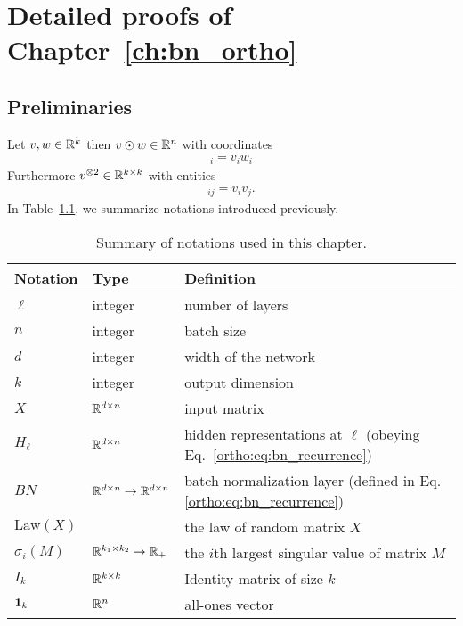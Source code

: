 

\chapter{Detailed proofs of Chapter~\ref{ch:bn_ortho}}


 \section{Preliminaries}
 Let $v,w \in \mathbb{R}^{k}$ then $v \odot w \in \mathbb{R}^{n}$ with coordinates
 \begin{align}
     [v \odot w ]_{i} = v_i w_i
 \end{align}
 Furthermore $v^{\otimes 2} \in \mathbb{R}^{k \times k}$ with entities
 \begin{align}
     [v^{\otimes 2}]_{ij} = v_i v_j. 
 \end{align}
 In Table~\ref{ortho:tab:notations}, we summarize notations introduced previously. 
 \begin{table}[!ht]
     \centering
     \begin{tabular}{|l|l l|}
     \hline
        Notation & Type & Definition \\ 
        \hline
        $\ell$  & integer & number of layers\\
        $n$  & integer & batch size \\ 
        $d$ & integer & width of the network\\ 
        $k$ & integer & output dimension \\ 
        $X$ & $\mathbb{R}^{d\times n}$ & input matrix\\ 
        $H_\ell$ & $\mathbb{R}^{d\times n}$ & hidden representations at $\ell$ (obeying Eq.~\eqref{ortho:eq:bn_recurrence})\\
        $BN$ & $\mathbb{R}^{d\times n} \to \mathbb{R}^{d\times n}$ & batch normalization layer (defined in Eq.\eqref{ortho:eq:bn_recurrence}) \\ 
        $\text{Law}(X)$ &  & the law of random matrix $X$ \\ 
        $\sigma_i(M)$ & $\mathbb{R}^{k_1\times k_2} \to \mathbb{R}_+$ & the $i$th largest singular value of matrix $M$ \\ 
        $I_k$ & $\mathbb{R}^{k \times k}$ & Identity matrix of size $k$ \\
        ${\bm{1}}_k$ & $\mathbb{R}^n$ &  all-ones vector
       \\ \hline
     \end{tabular}
     \vspace{0.1cm}
    \caption{Summary of notations used in this chapter.}
     \label{ortho:tab:notations}
 \end{table}
